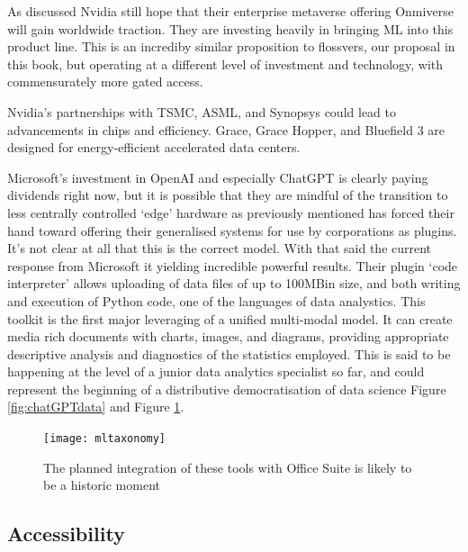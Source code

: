 As discussed Nvidia still hope that their enterprise metaverse offering Onmiverse will gain worldwide traction. They are investing heavily in bringing ML into this product line. This is an incrediby similar proposition to flossvers, our proposal in this book, but operating at a different level of investment and technology, with commensurately more gated access. \par
Nvidia's partnerships with TSMC, ASML, and Synopsys could lead to advancements in chips and efficiency. Grace, Grace Hopper, and Bluefield 3 are designed for energy-efficient accelerated data centers.\par
Microsoft's investment in OpenAI and especially ChatGPT is clearly paying dividends right now, but it is possible that they are mindful of the transition to less centrally controlled `edge' hardware as previously mentioned has forced their hand toward offering their generalised systems for use by corporations as plugins. It's not clear at all that this is the correct model. With that said the current response from Microsoft it yielding incredible powerful results. Their plugin `code interpreter' allows uploading of data files of up to 100MBin size, and both writing and execution of Python code, one of the languages of data analystics. This toolkit is the first major leveraging of a unified multi-modal model. It can create media rich documents with charts, images, and diagrams, providing appropriate descriptive analysis and diagnostics of the statistics employed. This is said to be happening at the level of a junior data analytics specialist so far, and could represent the beginning of a distributive democratisation of data science Figure \ref{fig:chatGPTdata} and Figure \ref{fig:chatGPTword}.


\begin{figure}
  \centering
    \texttt{[image: mltaxonomy]}
  \caption{The planned integration of these tools with Office Suite is likely to be a historic moment}
  \label{fig:chatGPTword}
\end{figure}


\subsection{Accessibility}

